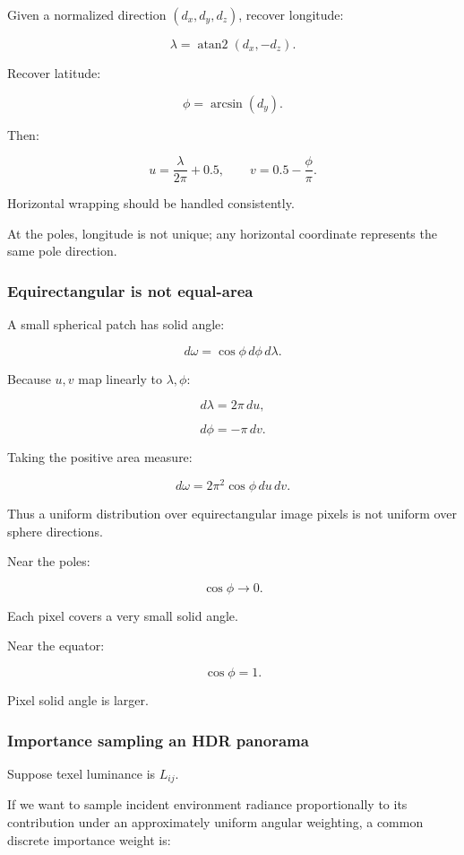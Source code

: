 Given a normalized direction \((d_x,d_y,d_z)\), recover longitude:

\[ \boxed{ \lambda=\operatorname{atan2}(d_x,-d_z). } \]

Recover latitude:

\[ \boxed{ \phi=\arcsin(d_y). } \]

Then:

\[ \boxed{ u=\frac{\lambda}{2\pi}+0.5, \qquad v=0.5-\frac{\phi}{\pi}. } \]

Horizontal wrapping should be handled consistently.

At the poles, longitude is not unique; any horizontal coordinate represents the same pole direction.

\subsubsection{Equirectangular is not equal-area}\label{equirectangular-is-not-equal-area}

A small spherical patch has solid angle:

\[ \boxed{ d\omega=\cos\phi\,d\phi\,d\lambda. } \]

Because \(u,v\) map linearly to \(\lambda,\phi\):

\[ d\lambda=2\pi\,du, \]

\[ d\phi=-\pi\,dv. \]

Taking the positive area measure:

\[ \boxed{ d\omega=2\pi^2\cos\phi\,du\,dv. } \]

Thus a uniform distribution over equirectangular image pixels is not uniform over sphere directions.

Near the poles:

\[ \cos\phi\to0. \]

Each pixel covers a very small solid angle.

Near the equator:

\[ \cos\phi=1. \]

Pixel solid angle is larger.

\subsubsection{Importance sampling an HDR panorama}\label{importance-sampling-an-hdr-panorama}

Suppose texel luminance is \(L_{ij}\).

If we want to sample incident environment radiance proportionally to its contribution under an approximately uniform angular weighting, a common discrete importance weight is:

